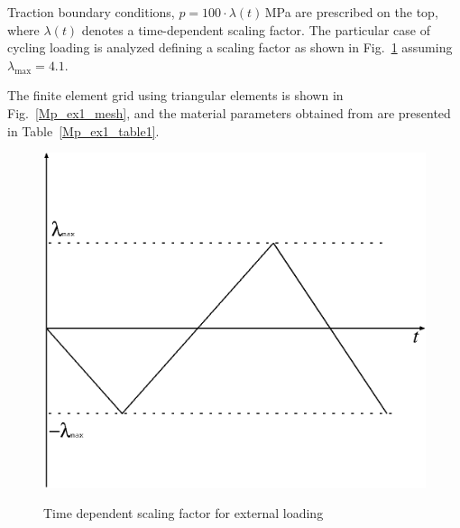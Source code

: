 Traction boundary conditions, $p=100\cdot\lambda(t)\,$MPa are prescribed on the top,  where $\lambda(t)$ denotes a time-dependent scaling factor. The particular case of cycling loading is analyzed defining a scaling factor as shown in Fig.~\ref{Mp_ex1_load} assuming $\lambda_{\mathrm{max}}=4.1$.

The finite element grid using triangular elements is shown in Fig.~\ref{Mp_ex1_mesh}, and the material parameters obtained from \cite{SteEtAl:03} are presented in Table~\ref{Mp_ex1_table1}.

\begin{figure}[!thb]
\centering
    \includegraphics[scale=0.5]{PART_II/M/ex1_load.eps}\\
   \caption{Time dependent scaling factor for external loading}
  \label{Mp_ex1_load}
\end{figure}

